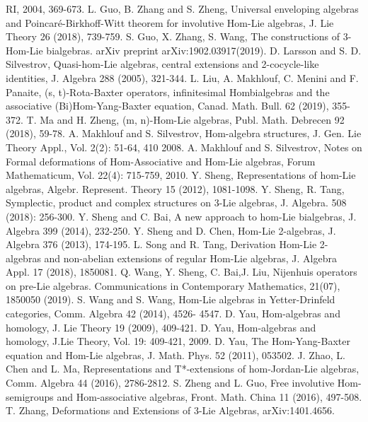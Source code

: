 \documentclass[a4paper,11pt]{article}
\theoremstyle{definition}
\begin{document}
\begin{thebibliography}{999}
RI, 2004, 369-673.
 L. Guo, B. Zhang and S. Zheng, Universal enveloping algebras and Poincar\'e-Birkhoff-Witt theorem for
involutive Hom-Lie algebras, J. Lie Theory 26 (2018), 739-759.
 S. Guo, X. Zhang, S. Wang, The constructions of 3-Hom-Lie bialgebras. arXiv preprint arXiv:1902.03917(2019).
 D. Larsson and S. D. Silvestrov, Quasi-hom-Lie algebras, central extensions and 2-cocycle-like identities,
J. Algebra 288 (2005), 321-344.
 L. Liu, A. Makhlouf, C. Menini and F. Panaite, (s, t)-Rota-Baxter operators, infinitesimal Hombialgebras and the associative (Bi)Hom-Yang-Baxter equation, Canad. Math. Bull. 62 (2019), 355-372.
 T. Ma and H. Zheng, (m, n)-Hom-Lie algebras, Publ. Math. Debrecen 92 (2018), 59-78.
 A. Makhlouf and S. Silvestrov,  Hom-algebra structures, J. Gen. Lie Theory Appl., Vol. 2(2): 51-64,
410 2008.
 A. Makhlouf and S. Silvestrov, Notes on Formal deformations of Hom-Associative and Hom-Lie
algebras, Forum Mathematicum, Vol. 22(4): 715-759, 2010.
 Y. Sheng, Representations of hom-Lie algebras, Algebr. Represent. Theory 15 (2012), 1081-1098.
    Y. Sheng, R. Tang, Symplectic, product and complex structures on 3-Lie algebras, J. Algebra. 508 (2018): 256-300.
Y. Sheng and C. Bai, A new approach to hom-Lie bialgebras, J. Algebra 399 (2014), 232-250.
 Y. Sheng and D. Chen, Hom-Lie 2-algebras, J. Algebra 376 (2013), 174-195.
 L. Song and R. Tang, Derivation Hom-Lie 2-algebras and non-abelian extensions of regular Hom-Lie
algebras, J. Algebra Appl. 17 (2018), 1850081.
 Q. Wang, Y. Sheng, C. Bai,J. Liu,  Nijenhuis operators on pre-Lie algebras. Communications in Contemporary Mathematics, 21(07), 1850050 (2019).
 S. Wang and S. Wang, Hom-Lie algebras in Yetter-Drinfeld categories, Comm. Algebra 42 (2014), 4526-
4547.
 D. Yau, Hom-algebras and homology, J. Lie Theory 19 (2009), 409-421.
  D. Yau, Hom-algebras and homology, J.Lie Theory, Vol. 19: 409-421, 2009.
   D. Yau, The Hom-Yang-Baxter equation and Hom-Lie algebras, J. Math. Phys. 52 (2011), 053502.
  J. Zhao, L. Chen and L. Ma, Representations and T*-extensions of hom-Jordan-Lie algebras, Comm.
Algebra 44 (2016), 2786-2812.
 S. Zheng and L. Guo, Free involutive Hom-semigroups and Hom-associative algebras, Front. Math.
China 11 (2016), 497-508.
 T. Zhang, Deformations and Extensions of 3-Lie Algebras, arXiv:1401.4656.






\end{thebibliography}
\end{document}
